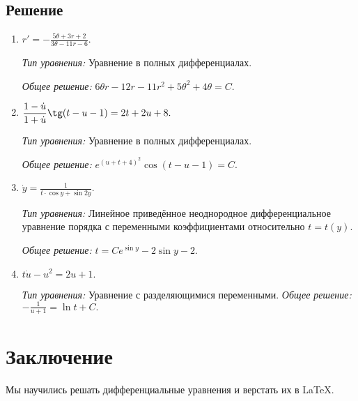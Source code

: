 \documentclass[14pt, a4paper, titlepage, fleqn]{extarticle}
\newcommand{\rnc}[1]
    {\MakeUppercase{\romannumeral #1}}
\begin{document}
        \subsection{Решение}
            \begin{enumerate}
                \item 
                \(
                    \displaystyle
                    r' = -\frac{5\theta + 3r + 2}{3\theta -11r-6}. 
                \)

                \textit{Тип уравнения:}
                Уравнение в полных дифференциалах.

                \textit{Общее решение:}
                \(
                    \displaystyle
                    6 \theta r-12r-11r^2+5\theta^2+4\theta=C.
                \)

                \item 
                \(
                    \displaystyle
                    \frac{1-\dot{u}}{1+\dot{u}} \tg (t-u-1) = 2t+2u+8.
                \)

                \textit{Тип уравнения:}
                Уравнение в полных дифференциалах.

                \textit{Общее решение:}
                \(
                    \displaystyle
                    e^{(u+t+4)^2} \cos(t-u-1) = C.
                \)

                \pagebreak
                \item 
                \(
                    \displaystyle
                    \dot{y} = \frac{1}{t \cdot \cos{y} + \sin{2y}}.
                \)

                \textit{Тип уравнения:}
                Линейное приведённое неоднородное дифференциальное уравнение 
                \rnc{1} порядка с переменными коэффициентами относительно
                \(t = t(y)\).

                \textit{Общее решение:}
                \(
                    \displaystyle
                    t = C e^{\sin{y}} - 2 \sin{y}-2.
                \)
                
                \item 
                \(
                    \displaystyle
                    t\dot{u} - u^2=2u+1.
                \)

                \textit{Тип уравнения:} Уравнение с разделяющимися переменными.
                \textit{Общее решение:}
                \(
                    \displaystyle
                    -\frac{1}{u+1}=\ln{t}+C.
                \)
            \end{enumerate}

    \pagebreak

    \section{Заключение}
        Мы научились решать дифференциальные 
        уравнения и верстать их в \LaTeX.
\end{document}
